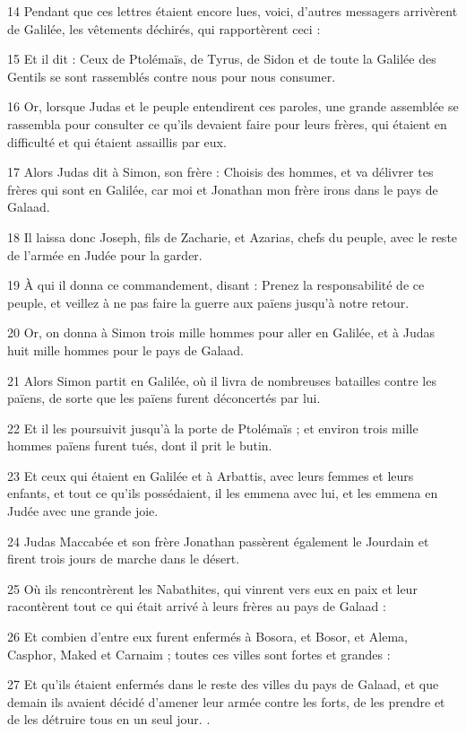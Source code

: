 \par 14 Pendant que ces lettres étaient encore lues, voici, d'autres messagers arrivèrent de Galilée, les vêtements déchirés, qui rapportèrent ceci :
\par 15 Et il dit : Ceux de Ptolémaïs, de Tyrus, de Sidon et de toute la Galilée des Gentils se sont rassemblés contre nous pour nous consumer.
\par 16 Or, lorsque Judas et le peuple entendirent ces paroles, une grande assemblée se rassembla pour consulter ce qu'ils devaient faire pour leurs frères, qui étaient en difficulté et qui étaient assaillis par eux.
\par 17 Alors Judas dit à Simon, son frère : Choisis des hommes, et va délivrer tes frères qui sont en Galilée, car moi et Jonathan mon frère irons dans le pays de Galaad.
\par 18 Il laissa donc Joseph, fils de Zacharie, et Azarias, chefs du peuple, avec le reste de l'armée en Judée pour la garder.
\par 19 À qui il donna ce commandement, disant : Prenez la responsabilité de ce peuple, et veillez à ne pas faire la guerre aux païens jusqu'à notre retour.
\par 20 Or, on donna à Simon trois mille hommes pour aller en Galilée, et à Judas huit mille hommes pour le pays de Galaad.
\par 21 Alors Simon partit en Galilée, où il livra de nombreuses batailles contre les païens, de sorte que les païens furent déconcertés par lui.
\par 22 Et il les poursuivit jusqu'à la porte de Ptolémaïs ; et environ trois mille hommes païens furent tués, dont il prit le butin.
\par 23 Et ceux qui étaient en Galilée et à Arbattis, avec leurs femmes et leurs enfants, et tout ce qu'ils possédaient, il les emmena avec lui, et les emmena en Judée avec une grande joie.
\par 24 Judas Maccabée et son frère Jonathan passèrent également le Jourdain et firent trois jours de marche dans le désert.
\par 25 Où ils rencontrèrent les Nabathites, qui vinrent vers eux en paix et leur racontèrent tout ce qui était arrivé à leurs frères au pays de Galaad :
\par 26 Et combien d'entre eux furent enfermés à Bosora, et Bosor, et Alema, Casphor, Maked et Carnaim ; toutes ces villes sont fortes et grandes :
\par 27 Et qu'ils étaient enfermés dans le reste des villes du pays de Galaad, et que demain ils avaient décidé d'amener leur armée contre les forts, de les prendre et de les détruire tous en un seul jour. .
